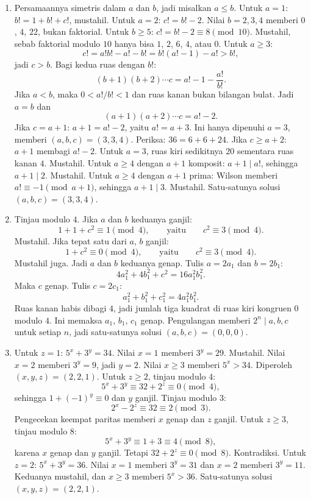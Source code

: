 \documentclass[12pt]{scrartcl}
\begin{document}
\begin{enumerate}[resume]
	\item Persamaannya simetris dalam $a$ dan $b$, jadi misalkan $a \le b$.
	Untuk $a = 1$: $b! = 1 + b! + c!$, mustahil.
	Untuk $a = 2$: $c! = b! - 2$.
	Nilai $b = 2, 3, 4$ memberi $0$, $4$, $22$, bukan faktorial.
	Untuk $b \ge 5$: $c! = b! - 2 \equiv 8 \pmod{10}$.
	Mustahil, sebab faktorial modulo $10$ hanya bisa $1$, $2$, $6$, $4$, atau $0$.
	Untuk $a \ge 3$:
	\[ c! = a!b! - a! - b! = b!(a! - 1) - a! > b!, \]
	jadi $c > b$. Bagi kedua ruas dengan $b!$:
	\[ (b+1)(b+2)\cdots c = a! - 1 - \frac{a!}{b!}. \]
	Jika $a < b$, maka $0 < a!/b! < 1$ dan ruas kanan bukan bilangan bulat.
	Jadi $a = b$ dan
	\[ (a+1)(a+2)\cdots c = a! - 2. \]
	Jika $c = a + 1$: $a + 1 = a! - 2$, yaitu $a! = a + 3$.
	Ini hanya dipenuhi $a = 3$, memberi $(a, b, c) = (3, 3, 4)$.
	Periksa: $36 = 6 + 6 + 24$.
	Jika $c \ge a + 2$: $a + 1$ membagi $a! - 2$.
	Untuk $a = 3$, ruas kiri sedikitnya $20$ sementara ruas kanan $4$. Mustahil.
	Untuk $a \ge 4$ dengan $a + 1$ komposit: $a + 1 \mid a!$,
	sehingga $a + 1 \mid 2$. Mustahil.
	Untuk $a \ge 4$ dengan $a + 1$ prima: Wilson memberi $a! \equiv -1 \pmod{a+1}$,
	sehingga $a + 1 \mid 3$. Mustahil.
	Satu-satunya solusi $(a, b, c) = (3, 3, 4)$.

	\item Tinjau modulo $4$. Jika $a$ dan $b$ keduanya ganjil:
	\[ 1 + 1 + c^2 \equiv 1 \pmod{4}, \qquad \text{yaitu} \qquad c^2 \equiv 3 \pmod{4}. \]
	Mustahil. Jika tepat satu dari $a$, $b$ ganjil:
	\[ 1 + c^2 \equiv 0 \pmod{4}, \qquad \text{yaitu} \qquad c^2 \equiv 3 \pmod{4}. \]
	Mustahil juga. Jadi $a$ dan $b$ keduanya genap.
	Tulis $a = 2a_1$ dan $b = 2b_1$:
	\[ 4a_1^2 + 4b_1^2 + c^2 = 16a_1^2b_1^2. \]
	Maka $c$ genap. Tulis $c = 2c_1$:
	\[ a_1^2 + b_1^2 + c_1^2 = 4a_1^2b_1^2. \]
	Ruas kanan habis dibagi $4$, jadi jumlah tiga kuadrat di ruas kiri
	kongruen $0$ modulo $4$. Ini memaksa $a_1$, $b_1$, $c_1$ genap.
	Pengulangan memberi $2^n \mid a, b, c$ untuk setiap $n$,
	jadi satu-satunya solusi $(a, b, c) = (0, 0, 0)$.

	\item Untuk $z = 1$: $5^x + 3^y = 34$.
	Nilai $x = 1$ memberi $3^y = 29$. Mustahil.
	Nilai $x = 2$ memberi $3^y = 9$, jadi $y = 2$.
	Nilai $x \ge 3$ memberi $5^x > 34$.
	Diperoleh $(x, y, z) = (2, 2, 1)$.
	Untuk $z \ge 2$, tinjau modulo $4$:
	\[ 5^x + 3^y \equiv 32 + 2^z \equiv 0 \pmod{4}, \]
	sehingga $1 + (-1)^y \equiv 0$ dan $y$ ganjil.
	Tinjau modulo $3$:
	\[ 2^x - 2^z \equiv 32 \equiv 2 \pmod{3}. \]
	Pengecekan keempat paritas memberi $x$ genap dan $z$ ganjil.
	Untuk $z \ge 3$, tinjau modulo $8$:
	\[ 5^x + 3^y \equiv 1 + 3 \equiv 4 \pmod{8}, \]
	karena $x$ genap dan $y$ ganjil.
	Tetapi $32 + 2^z \equiv 0 \pmod{8}$. Kontradiksi.
	Untuk $z = 2$: $5^x + 3^y = 36$.
	Nilai $x = 1$ memberi $3^y = 31$ dan $x = 2$ memberi $3^y = 11$.
	Keduanya mustahil, dan $x \ge 3$ memberi $5^x > 36$.
	Satu-satunya solusi $(x, y, z) = (2, 2, 1)$.


\end{enumerate}
\end{document}
